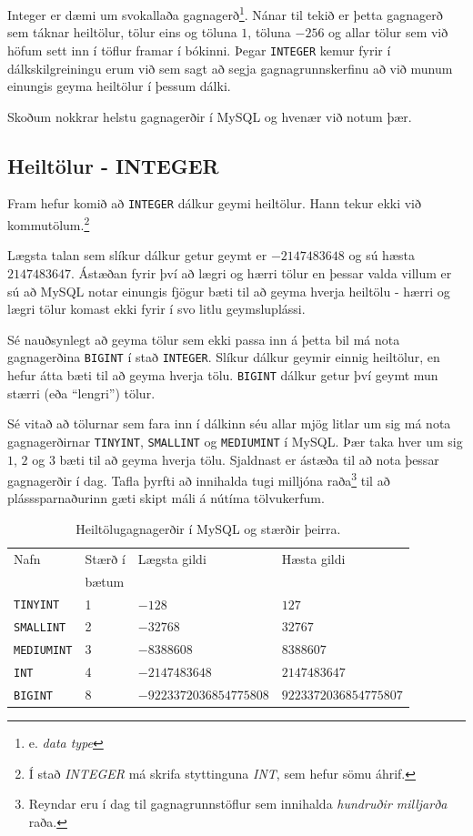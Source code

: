 Integer er dæmi um svokallaða gagnagerð\footnote{e. \emph{data type}}. Nánar til tekið er þetta gagnagerð sem táknar heiltölur, tölur eins og töluna $1$, töluna $-256$ og allar tölur sem við höfum sett inn í töflur framar í bókinni. Þegar \verb|INTEGER| kemur fyrir í dálkskilgreiningu erum við sem sagt að segja gagnagrunnskerfinu að við munum einungis geyma heiltölur í þessum dálki.

Skoðum nokkrar helstu gagnagerðir í MySQL og hvenær við notum þær.
\subsection{Heiltölur - INTEGER}
Fram hefur komið að \verb|INTEGER| dálkur geymi heiltölur. Hann tekur ekki við kommutölum.\footnote{Í stað \emph{INTEGER} má skrifa styttinguna \emph{INT}, sem hefur sömu áhrif.}

Lægsta talan sem slíkur dálkur getur geymt er $-2147483648$ og sú hæsta $2147483647$. Ástæðan fyrir því að lægri og hærri tölur en þessar valda villum er sú að MySQL notar einungis fjögur bæti til að geyma hverja heiltölu - hærri og lægri tölur komast ekki fyrir í svo litlu geymsluplássi.

Sé nauðsynlegt að geyma tölur sem ekki passa inn á þetta bil má nota gagnagerðina \verb|BIGINT| í stað \verb|INTEGER|. Slíkur dálkur geymir einnig heiltölur, en hefur átta bæti til að geyma hverja tölu. \verb|BIGINT| dálkur getur því geymt mun stærri (eða ``lengri'') tölur.

Sé vitað að tölurnar sem fara inn í dálkinn séu allar mjög litlar um sig má nota gagnagerðirnar \verb|TINYINT|, \verb|SMALLINT| og \verb|MEDIUMINT| í MySQL. Þær taka hver um sig $1$, $2$ og $3$ bæti til að geyma hverja tölu. Sjaldnast er ástæða til að nota þessar gagnagerðir í dag. Tafla þyrfti að innihalda tugi milljóna raða\footnote{Reyndar eru í dag til gagnagrunnstöflur sem innihalda \emph{hundruðir milljarða} raða.} til að plásssparnaðurinn gæti skipt máli á nútíma tölvukerfum.

\begin{table}
\centering
\caption[Heiltöludálkar]{Heiltölugagnagerðir í MySQL og stærðir þeirra.}
\label{tafla:heiltolur}
\begin{tabular}{llll}
\toprule
Nafn&Stærð í&Lægsta gildi&Hæsta gildi\\
&bætum&&\\
\midrule
\verb|TINYINT|&1&$-128$&$127$\\
\verb|SMALLINT|&2&$-32768$&$32767$\\
\verb|MEDIUMINT|&3&$-8388608$&$8388607$\\
\verb|INT|&4&$-2147483648$&$2147483647$\\
\verb|BIGINT|&8&$-9223372036854775808$&$9223372036854775807$\\
\bottomrule
\end{tabular}
\end{table}

